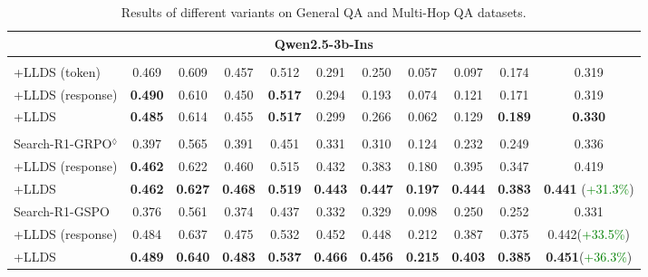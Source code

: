 \begin{table}[t]
{\begin{tabular}{l|ccc|c|cccc|c|c}
\midrule
\multicolumn{11}{c}{Qwen2.5-3b-Ins} \\
\midrule
\rowcolor{gray!6} \multicolumn{11}{l}{\textbf{NQ-Only}} \\
+LLDS (token)                & 0.469 & 0.609 & 0.457 & 0.512 & 0.291 & 0.250 & 0.057 & 0.097 & 0.174 & 0.319 \\
+LLDS (response)                & \textbf{0.490} & 0.610 & 0.450 & \textbf{0.517} & 0.294 & 0.193 & 0.074 & 0.121 & 0.171 & 0.319 \\
+LLDS                & \textbf{0.485} & 0.614 & 0.455 & \textbf{0.517} & 0.299 & 0.266 & 0.062 & 0.129 & \textbf{0.189} & \textbf{0.330} \\
\rowcolor{gray!6} \multicolumn{11}{l}{\textbf{NQ+Hotpot}} \\
Search-R1-GRPO$^{\lozenge}$    & 0.397 & 0.565 & 0.391 & 0.451 & 0.331 & 0.310 & 0.124 & 0.232 & 0.249 & 0.336 \\
+LLDS (response)        & \textbf{0.462} & 0.622 & 0.460 & 0.515 & 0.432 & 0.383 & 0.180 & 0.395 & 0.347 & 0.419 \\
+LLDS     & \textbf{0.462} & \textbf{0.627} & \textbf{0.468} & \textbf{0.519} & \textbf{0.443} & \textbf{0.447} & \textbf{0.197} & \textbf{0.444} & \textbf{0.383} & \textbf{0.441} (\textcolor{green}{+31.3\%})  \\
\hline
Search-R1-GSPO
& 0.376 
& 0.561 
& 0.374 
& 0.437
& 0.332 
& 0.329 
& 0.098 
& 0.250
& 0.252
& 0.331 \\
+LLDS (response)
& 0.484 & 0.637 & 0.475 
& 0.532
& 0.452 & 0.448 & 0.212 & 0.387
& 0.375
& 0.442(\textcolor{green}{+33.5\%}) \\
+LLDS
& \textbf{0.489} & \textbf{0.640} & \textbf{0.483} 
& \textbf{0.537}
& \textbf{0.466} & \textbf{0.456} & \textbf{0.215} & \textbf{0.403}
& \textbf{0.385}
&\textbf{0.451}(\textcolor{green}{+36.3\%}) \\
\bottomrule
\end{tabular}
}
\caption{Results of different \ours{} variants on General QA and Multi-Hop QA datasets.}
\vspace{-3mm}
\label{tab:llds_variant}
\end{table}

